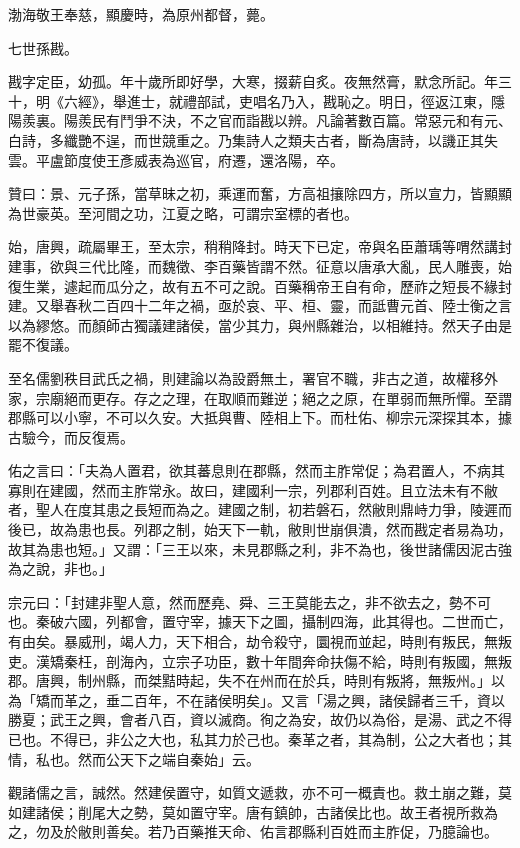 \begin{pinyinscope}
 渤海敬王奉慈，顯慶時，為原州都督，薨。



 七世孫戡。



 戡字定臣，幼孤。年十歲所即好學，大寒，掇薪自炙。夜無然膏，默念所記。年三十，明《六經》，舉進士，就禮部試，吏唱名乃入，戡恥之。明日，徑返江東，隱陽羨裏。陽羨民有鬥爭不決，不之官而詣戡以辨。凡論著數百篇。常惡元和有元、白詩，多纖艷不逞，而世競重之。乃集詩人之類夫古者，斷為唐詩，以譏正其失雲。平盧節度使王彥威表為巡官，府遷，還洛陽，卒。



 贊曰：景、元子孫，當草昧之初，乘運而奮，方高祖攘除四方，所以宣力，皆顯顯為世豪英。至河間之功，江夏之略，可謂宗室標的者也。



 始，唐興，疏屬畢王，至太宗，稍稍降封。時天下已定，帝與名臣蕭瑀等喟然講封建事，欲與三代比隆，而魏徵、李百藥皆謂不然。征意以唐承大亂，民人雕喪，始復生業，遽起而瓜分之，故有五不可之說。百藥稱帝王自有命，歷祚之短長不緣封建。又舉春秋二百四十二年之禍，亟於哀、平、桓、靈，而詆曹元首、陸士衡之言以為繆悠。而顏師古獨議建諸侯，當少其力，與州縣雜治，以相維持。然天子由是罷不復議。



 至名儒劉秩目武氏之禍，則建論以為設爵無土，署官不職，非古之道，故權移外家，宗廟絕而更存。存之之理，在取順而難逆；絕之之原，在單弱而無所憚。至謂郡縣可以小寧，不可以久安。大抵與曹、陸相上下。而杜佑、柳宗元深探其本，據古驗今，而反復焉。



 佑之言曰：「夫為人置君，欲其蕃息則在郡縣，然而主胙常促；為君置人，不病其寡則在建國，然而主胙常永。故曰，建國利一宗，列郡利百姓。且立法未有不敝者，聖人在度其患之長短而為之。建國之制，初若磐石，然敝則鼎峙力爭，陵遲而後已，故為患也長。列郡之制，始天下一軌，敝則世崩俱潰，然而戡定者易為功，故其為患也短。」又謂：「三王以來，未見郡縣之利，非不為也，後世諸儒因泥古強為之說，非也。」



 宗元曰：「封建非聖人意，然而歷堯、舜、三王莫能去之，非不欲去之，勢不可也。秦破六國，列都會，置守宰，據天下之圖，攝制四海，此其得也。二世而亡，有由矣。暴威刑，竭人力，天下相合，劫令殺守，圜視而並起，時則有叛民，無叛吏。漢矯秦枉，剖海內，立宗子功臣，數十年間奔命扶傷不給，時則有叛國，無叛郡。唐興，制州縣，而桀黠時起，失不在州而在於兵，時則有叛將，無叛州。」以為「矯而革之，垂二百年，不在諸侯明矣」。又言「湯之興，諸侯歸者三千，資以勝夏；武王之興，會者八百，資以滅商。徇之為安，故仍以為俗，是湯、武之不得已也。不得已，非公之大也，私其力於己也。秦革之者，其為制，公之大者也；其情，私也。然而公天下之端自秦始」云。



 觀諸儒之言，誠然。然建侯置守，如質文遞救，亦不可一概責也。救土崩之難，莫如建諸侯；削尾大之勢，莫如置守宰。唐有鎮帥，古諸侯比也。故王者視所救為之，勿及於敝則善矣。若乃百藥推天命、佑言郡縣利百姓而主胙促，乃臆論也。



\end{pinyinscope}
